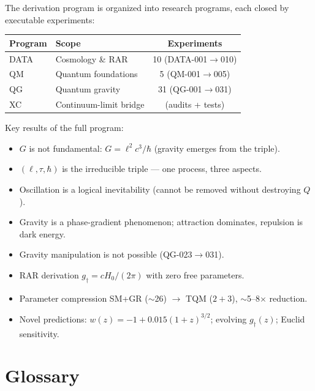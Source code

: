 \documentclass[11pt,twoside]{book}
\begin{document}
The derivation program is organized into research programs, each closed by executable
experiments:

\begin{center}
\begin{tabular}{llc}
\toprule
Program & Scope & Experiments \\
\midrule
DATA & Cosmology \& RAR & 10 (DATA-001$\to$010) \\
QM & Quantum foundations & 5 (QM-001$\to$005) \\
QG & Quantum gravity & 31 (QG-001$\to$031) \\
XC & Continuum-limit bridge & (audits + tests) \\
\bottomrule
\end{tabular}
\end{center}

Key results of the full program:
\begin{itemize}
\item $G$ is not fundamental: $G=\ell^2c^3/\hbar$ (gravity emerges from the triple).
\item $(\ell,\tau,\hbar)$ is the irreducible triple — one process, three aspects.
\item Oscillation is a logical inevitability (cannot be removed without destroying $Q$).
\item Gravity is a phase-gradient phenomenon; attraction dominates, repulsion is dark
energy.
\item Gravity manipulation is not possible (QG-023$\to$031).
\item RAR derivation $g_\dagger=cH_0/(2\pi)$ with zero free parameters.
\item Parameter compression SM+GR ($\sim$26) $\to$ TQM ($2{+}3$), $\sim$5--8$\times$
reduction.
\item Novel predictions: $w(z)=-1+0.015(1+z)^{3/2}$; evolving $g_\dagger(z)$; Euclid
sensitivity.
\end{itemize}

\chapter{Glossary}
\label{app:glossary}
\end{document}

